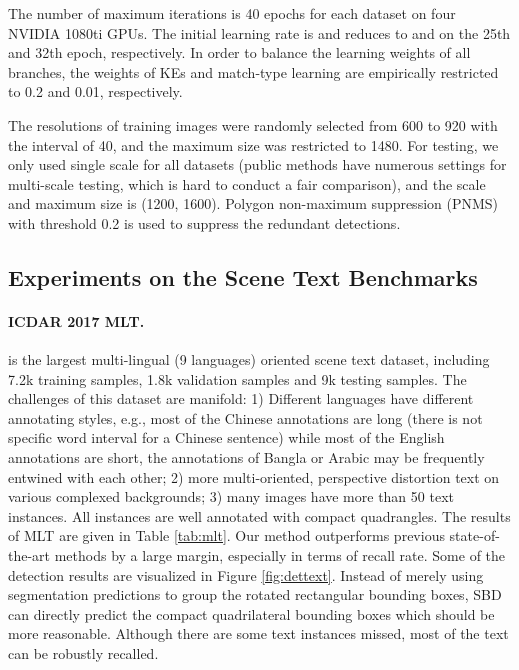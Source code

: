 \documentclass{article}
\begin{document}
The number of maximum iterations is 40 epochs for each dataset on four NVIDIA 1080ti GPUs. The initial learning rate is  and reduces to  and  on the 25th and 32th epoch, respectively. In order to balance the learning weights of all branches, the weights of KEs and match-type learning are empirically restricted to 0.2 and 0.01, respectively.

The resolutions of training images were randomly selected from 600 to 920 with the interval of 40, and the maximum size was restricted to 1480.
For testing, we only used single scale for all datasets (public methods have numerous settings for multi-scale testing, which is hard to conduct a fair comparison), and the scale and maximum size is (1200, 1600). Polygon non-maximum suppression (PNMS) \cite{yuliang2017detecting} with threshold 0.2 is used to suppress the redundant detections.

\subsection{Experiments on the Scene Text Benchmarks}

\paragraph{ICDAR 2017 MLT.} \cite{nayef2017icdar2017} is the largest multi-lingual (9 languages) oriented scene text dataset, including 7.2k training samples, 1.8k validation samples and 9k testing samples. The challenges of this dataset are manifold: 1) Different languages have different annotating styles, e.g., most of the Chinese annotations are long (there is not specific word interval for a Chinese sentence) while most of the English annotations are short, the annotations of Bangla or Arabic may be frequently entwined with each other; 2) more multi-oriented, perspective distortion text on various complexed backgrounds; 3) many images have more than 50 text instances. All instances are well annotated with compact quadrangles. The results of MLT are given in Table \ref{tab:mlt}. Our method outperforms previous state-of-the-art methods by a large margin, especially in terms of recall rate. Some of the detection results are visualized in Figure \ref{fig:dettext}. Instead of merely using segmentation predictions to group the rotated rectangular bounding boxes, SBD can directly predict the compact quadrilateral bounding boxes which should be more reasonable. Although there are some text instances missed, most of the text can be robustly recalled.
\end{document}
